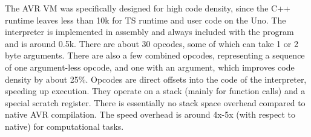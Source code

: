 The AVR VM was specifically designed for high code density, since the C++ runtime
leaves less than 10k for TS runtime and user code on the Uno.
The interpreter is implemented in assembly and always included with the program and is around 0.5k.
There are about 30 opcodes, some of which can take 1 or 2 byte arguments.
There are also a few combined opcodes, representing a sequence of one argument-less opcode,
and one with an argument, which improves code density by about 25\%.
Opcodes are direct offsets into the code of the interpreter, speeding up execution.
They operate on a stack (mainly for function calls) and a special scratch register.
There is essentially no stack space overhead compared to native AVR compilation.
The speed overhead is around 4x-5x (with respect to native) for computational tasks.



